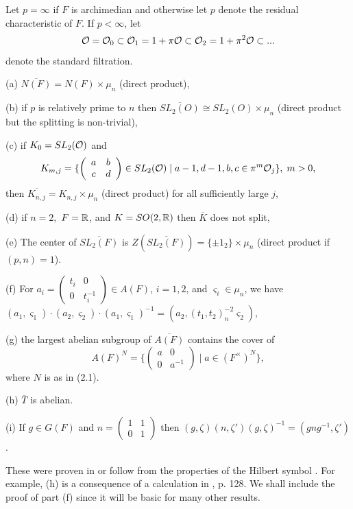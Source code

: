 Let $p=\infty$ if $F$ is archimedian and otherwise
let $p$ denote the residual characteristic of $F$.
If $p<\infty$, let
\[
{\cal{O}}={\cal{O}}_0\subset {\cal{O}}_1=1+\pi{\cal{O}}
\subset {\cal{O}}_2=1+\pi^2{\cal{O}}\subset ...
\]
denote the standard filtration.
\begin{lemma}
(a) $\overline{N(F)}=N(F)\times \mu _n$ (direct product),

(b) if $p$ is relatively prime to $n$ then
$\overline{SL_2(O)}\cong SL_2(O)\times
\mu _n$ (direct product but the splitting is non-trivial),

(c) if $K_0=SL_2({\cal{O}})$ and 
\[
K_{m,j}=\{\left( 
\begin{array}{cc}
a & b \\ 
c & d
\end{array}
\right) \in SL_2({\cal{O}})\;|\;a-1,d-1,b,c\in \pi ^m{\cal{O}}_j\},
\;m>0,
\]
then $\overline{K_{n,j}}=K_{n,j}\times \mu _n$
(direct product) for all sufficiently large $j$,

(d) if $n=2,$ $F={\Bbb {R}}$, and $K=SO(2,{\Bbb {R})}$ then
$\overline{K}$ does not split,

(e) The center of $\overline{SL_2(F)}$ is $Z(\overline{SL_2(F)})=\{\pm
1_2\}\times \mu _n$ (direct product if $(p,n)=1$).

(f) For $a_i=\left( 
\begin{array}{cc}
t_i & 0 \\ 
0 & t_i^{-1}
\end{array}
\right) \in A(F)$, $i=1,2$, and $\varsigma _i\in \mu _n$, we have $%
(a_1,\varsigma _1)\cdot (a_2,\varsigma _2)\cdot (a_1,\varsigma
_1)^{-1}=(a_2,(t_1,t_2)_n^{-2}\varsigma _2)$,

(g) the largest abelian subgroup of $\overline{A(F)}$ contains the cover of
\[
A(F)^N=\{\left( 
\begin{array}{cc}
a & 0 \\ 
0 & a^{-1}
\end{array}
\right) \;|\;a\in (F^{\times })^N\},
\]
where $N$ is as in (2.1). 

(h) $\overline{T}$ is abelian.

(i) If $g\in G(F)$ and
$n=
\left(
\begin{array}{cc}
1 & 1\\
0 & 1
\end{array}
\right)
$
then $(g,\zeta)(n,\zeta ')(g,\zeta)^{-1}
=(gng^{-1},\zeta')$.

\end{lemma}

\begin{remark}
These were proven in \cite{K2} or follow from the properties of the Hilbert
symbol \cite{W1}.
For example, (h) is a consequence of a calculation in \cite{Fl}, p. 128.
We shall include the proof of part (f) since it will be basic for many
other results.
\end{remark}

